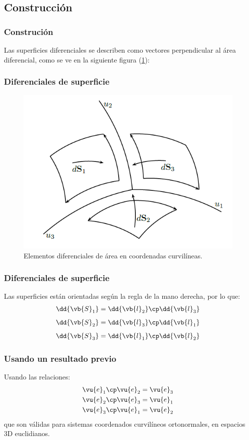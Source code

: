 \subsection{Construcción}
\begin{frame}
\frametitle{Construción}
Las superficies diferenciales se describen como vectores perpendicular al área diferencial, como se ve en la siguiente figura (\ref{fig:figura_diferenciales_superficie}):
\end{frame}
\begin{frame}
\frametitle{Diferenciales de superficie}
\begin{figure}[h!]
    \centering
    \includegraphics[scale=0.5]{Imagenes/Diferenciales_Superficie_01.png}
    \caption{Elementos diferenciales de área en coordenadas curvilíneas.}
    \label{fig:figura_diferenciales_superficie}
\end{figure}
\end{frame}
\begin{frame}
\frametitle{Diferenciales de superficie}
Las superficies están orientadas según la regla de la mano derecha, por lo que:
\begin{align*}
\dd{\vb{S}_{1}} &= \dd{\vb{l}_{2}} \cp \dd{\vb{l}_{3}} \\[0.5em] 
\dd{\vb{S}_{2}} &= \dd{\vb{l}_{3}} \cp \dd{\vb{l}_{1}} \\[0.5em]
\dd{\vb{S}_{3}} &= \dd{\vb{l}_{1}} \cp \dd{\vb{l}_{2}}
\end{align*}
\end{frame}
\begin{frame}
\frametitle{Usando un resultado previo}
Usando las relaciones:
\begin{align*}
\vu{e}_{1} \cp \vu{e}_{2} = \vu{e}_{3} \\
\vu{e}_{2} \cp \vu{e}_{3} = \vu{e}_{1} \\
\vu{e}_{3} \cp \vu{e}_{1} = \vu{e}_{2}
\end{align*}
que son válidas para sistemas coordenados curvilíneos ortonormales, en espacios 3D euclidianos.
\end{frame}
